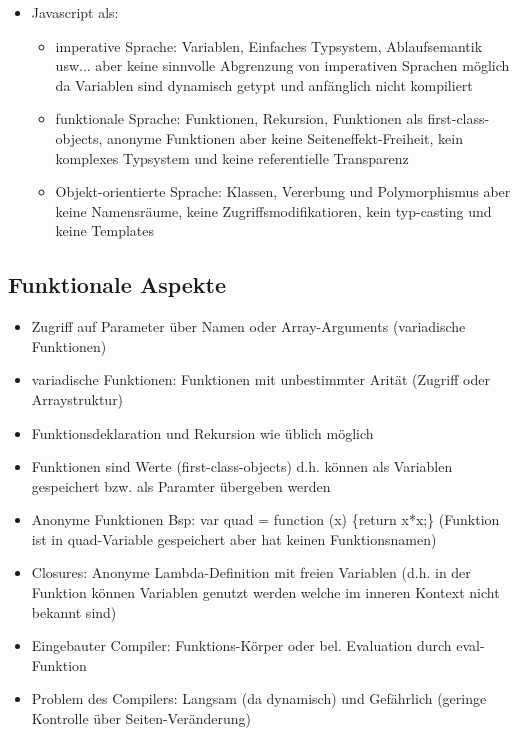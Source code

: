 \documentclass{article} %
\begin{document}
\begin{itemize}
		\item Javascript als:
		\begin{itemize}
			\item imperative Sprache: Variablen, Einfaches Typsystem, Ablaufsemantik usw... aber keine sinnvolle Abgrenzung von imperativen Sprachen möglich da Variablen sind dynamisch getypt und anfänglich nicht kompiliert
			\item funktionale Sprache: Funktionen, Rekursion, Funktionen als first-class-objects, anonyme Funktionen aber keine Seiteneffekt-Freiheit, kein komplexes Typsystem und keine referentielle Transparenz
			\item Objekt-orientierte Sprache: Klassen, Vererbung und Polymorphismus aber keine Namensräume, keine Zugriffsmodifikatioren, kein typ-casting und keine Templates
		\end{itemize}
	\end{itemize}
	\subsection{Funktionale Aspekte}
	\begin{itemize}
		\item Zugriff auf Parameter über Namen oder Array-Arguments (variadische Funktionen)
		\item variadische Funktionen: Funktionen mit unbestimmter Arität (Zugriff oder Arraystruktur)
		\item Funktionsdeklaration und Rekursion wie üblich möglich
		\item Funktionen sind Werte (first-class-objects) d.h. können als Variablen gespeichert bzw. als Paramter übergeben werden
		\item Anonyme Funktionen Bsp: var quad = function (x) \{return x*x;\} (Funktion ist in quad-Variable gespeichert aber hat keinen Funktionsnamen)
		\item Closures: Anonyme Lambda-Definition mit freien Variablen (d.h. in der Funktion können Variablen genutzt werden welche im inneren Kontext nicht bekannt sind)
		\item Eingebauter Compiler: Funktions-Körper oder bel. Evaluation durch eval-Funktion
		\item Problem des Compilers: Langsam (da dynamisch) und Gefährlich (geringe Kontrolle über Seiten-Veränderung)
	\end{itemize}
\end{document}
